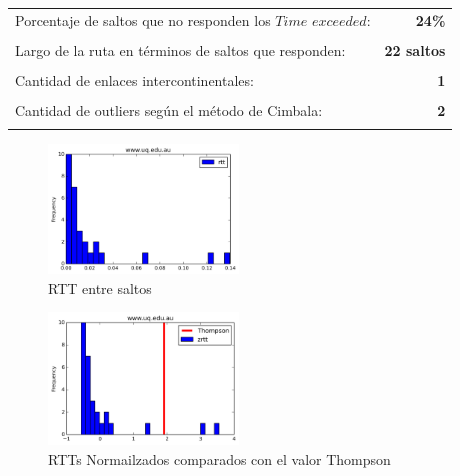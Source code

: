 \begin{center}
\begin{tabular}{p{6.5cm}r}
Porcentaje de saltos que no responden los $Time$ $exceeded$: & \textbf{24\%} \\ \\ 
Largo de la ruta en términos de saltos que responden: &\textbf{22 saltos} \\ \\
Cantidad de enlaces intercontinentales: & \textbf{1} \\ \\
Cantidad de outliers según el método de Cimbala: & \textbf{2} \\ \\
\end{tabular}
\end{center}

\begin{figure}[H]
  \centering
    \includegraphics[width=0.45\textwidth]{histogramas_rtt/www-uq-edu-au.png}
  \caption{RTT entre saltos}
  \label{entropia-s}
\end{figure}

\begin{center}

\end{center}

\begin{figure}[H]
  \centering
    \includegraphics[width=0.45\textwidth]{histogramas_thompson/www-uq-edu-au.png}
  \caption{RTTs Normailzados comparados con el valor Thompson}
  \label{entropia-s}
\end{figure}

